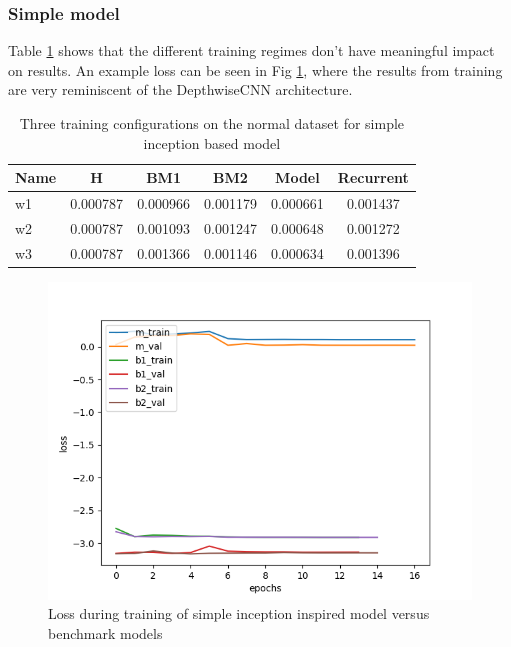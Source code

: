 \subsubsection*{Simple model}
Table \ref{tab:simple_normal} shows that the different training regimes don't have meaningful impact on results. An example loss can be seen in Fig \ref{fig:simple-incep-loss}, where the results from training are very reminiscent of the DepthwiseCNN architecture. 
\begin{table}[htbp]
	\centering
	\caption{Three training configurations on the normal dataset for simple inception based model}
	\label{tab:simple_normal}
	\begin{tabular}{p{2cm}ccccc}
		\toprule
		Name &  H &  BM1 &  BM2 &  Model &  Recurrent \\
		\midrule
		w1 &       0.000787 &        0.000966 &        0.001179 &   0.000661 &            0.001437 \\
		w2 &       0.000787 &        0.001093 &        0.001247 &   0.000648 &            0.001272 \\
		w3 &       0.000787 &        0.001366 &        0.001146 &   0.000634 &            0.001396 \\
		\bottomrule
	\end{tabular}
\end{table}


\begin{figure}[tbph]
	\centering
	\includegraphics[width=0.8\linewidth, height=0.3\textheight]{Figures/Results/Inception_model/simple_incep_train_5_custom_mae_weighted_8_norm_independant_rf_added_292_training}
	\caption[Loss during training of simple inception inspired model versus benchmark models]{Loss during training of simple inception inspired model versus benchmark models}
	\label{fig:simple-incep-loss}
\end{figure}


